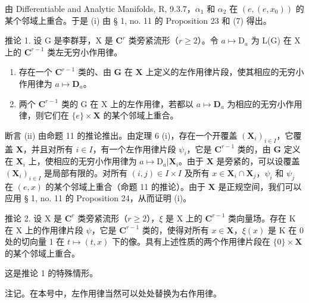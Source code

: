 由 Differentiable and Analytic Manifolds, R, 9.3.7，\(\alpha_{1}\) 和 \(\alpha_{2}\) 在 \((e, (e, x_{0}))\) 的某个邻域上重合。于是 (i) 由 § 1, no. 11 的 Proposition 23 和 (7) 得出。

推论 1. 设 G 是李群芽，X 是 \(\mathbf{C}^r\) 类旁紧流形（\(r \geqslant 2\)）。令 \(a \mapsto \mathrm{D}_a\) 为 L(G) 在 X 上的 \(\mathbf{C}^{r-1}\) 类左无穷小作用律。

\begin{enumerate}
\def\labelenumi{(\roman{enumi})}
\item
  存在一个 \(\mathbf{C}^{r-1}\) 类的、由 \(\mathbf{G}\) 在 \(\mathbf{X}\) 上定义的左作用律片段，使其相应的无穷小作用律为 \(a \mapsto \mathbf{D}_a\)。
\item
  两个 \(\mathbf{C}^{r-1}\) 类的 G 在 X 上的左作用律，若都以 \(a \mapsto \mathbf{D}_a\) 为相应的无穷小作用律，则它们在 \(\{e\} \times \mathbf{X}\) 的某个邻域上重合。
\end{enumerate}

断言 (ii) 由命题 11 的推论推出。由定理 6 (i)，存在一个开覆盖 \((\mathbf{X}_i)_{i\in I}\)，它覆盖 \(\mathbf{X}\)，并且对所有 \(i\in I\)，有一个左作用律片段 \(\psi_i\)，它是 \(\mathbf{C}^{r-1}\) 类的，由 \(\mathbf{G}\) 定义在 \(\mathbf{X}_i\) 上，使相应的无穷小作用律为 \(a\mapsto \mathrm{D}_a|\mathbf{X}_i\)。由于 \(\mathbf{X}\) 是旁紧的，可以设覆盖 \((\mathbf{X}_i)_{i\in I}\) 是局部有限的。对所有 \((i,j)\in I\times I\) 及所有 \(x\in \mathbf{X}_i\cap \mathbf{X}_j\)，\(\psi_i\) 和 \(\psi_j\) 在 \((e,x)\) 的某个邻域上重合（命题 11 的推论）。由于 \(\mathbf{X}\) 是正规空间，我们可以应用 § 1, no. 11 的 Proposition 24，从而证明 (i)。

推论 2. 设 X 是 \(\mathbf{C}^r\) 类旁紧流形（\(r \geqslant 2\)），\(\xi\) 是 X 上的 \(\mathbf{C}^{r-1}\) 类向量场。存在 K 在 X 上的作用律片段 \(\psi\)，它是 \(\mathbf{C}^{r-1}\) 类的，使得对所有 \(x \in \mathbf{X}\)，\(\xi(x)\) 是 K 在 0 处的切向量 1 在 \(t \mapsto (t, x)\) 下的像。具有上述性质的两个作用律片段在 \(\{0\} \times \mathbf{X}\) 的某个邻域上重合。

这是推论 1 的特殊情形。

注记。在本号中，左作用律当然可以处处替换为右作用律。


